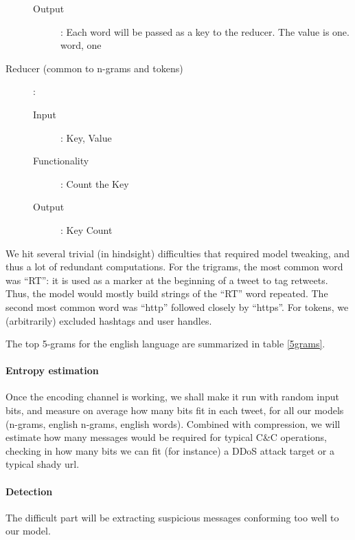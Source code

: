 \documentclass[a4paper,11pt]{article}
\begin{document}
\begin{flushleft}
\begin{description}
\begin{description}
\item[Output]: Each word will be passed as a key to the reducer. The value is one. 
		{word, one}
			
\end{description}
	
\item[Reducer (common to n-grams and tokens)]:

\begin{description}
\item[Input]: {Key, Value}

\item[Functionality]: Count the Key

\item[Output]: Key Count
\end{description}

\end{description}
 
\end{flushleft}

We hit several trivial (in hindsight) difficulties that required model tweaking, and thus a lot of redundant computations. For the trigrams, the most common word was ``RT'': it is used as a marker at the beginning of a tweet to tag retweets. Thus, the model would mostly build strings of the ``RT'' word repeated. The second most common word was ``http'' followed closely by ``https''. For tokens, we (arbitrarily) excluded hashtags and user handles.

The top 5-grams for the english language are summarized in table \ref{5grams}.

\paragraph{Entropy estimation}

Once the encoding channel is working, we shall make it run with random input bits, and measure on average how many bits fit in each tweet, for all our models (n-grams, english n-grams, english words). Combined with compression, we will estimate how many messages would be required for typical C\&C operations, checking in how many bits we can fit (for instance) a DDoS attack target or a typical shady url.

\paragraph{Detection}

The difficult part will be extracting suspicious messages conforming too well to our model. 
\end{document}
